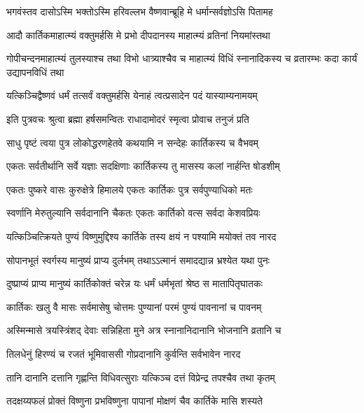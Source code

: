 \twolineshloka
{भगवंस्तव दासोऽस्मि भक्तोऽस्मि हरिवल्लभ}
{वैष्णवान्ब्रूहि मे धर्मान्सर्वज्ञोऽसि पितामह} %

\twolineshloka
{आदौ कार्तिकमाहात्म्यं वक्तुमर्हसि मे प्रभो}
{दीपदानस्य माहात्म्यं व्रतिनां नियमांस्तथा} %

\threelineshloka
{गोपीचन्दनमाहात्म्यं तुलस्याश्च तथा विभो}
{धात्र्याश्चैव च माहात्म्यं विधिं स्नानादिकस्य च}
{व्रतारम्भः कदा कार्यं उद्यापनविधिं तथा} %

\twolineshloka
{यत्किञ्चिद्वैष्णवं धर्मं तत्सर्वं वक्तुमर्हसि}
{येनाहं त्वत्प्रसादेन पदं यास्याम्यनामयम्} %


\twolineshloka
{इति पुत्रवचः श्रुत्वा ब्रह्मा हर्षसमन्वितः}
{राधादामोदरं स्मृत्वा प्रोवाच तनुजं प्रति} %


\twolineshloka
{साधु पृष्टं त्वया पुत्र लोकोद्धरणहेतवे}
{कथयामि न सन्देहः कार्तिकस्य च वैभवम्} %

\twolineshloka
{एकतः सर्वतीर्थानि सर्वे यज्ञाः सदक्षिणाः}
{कार्तिकस्य तु मासस्य कलां नार्हन्ति षोडशीम्} %

\twolineshloka
{एकतः पुष्करे वासः कुरुक्षेत्रे हिमालये}
{एकतः कार्तिकः पुत्र सर्वपुण्याधिको मतः} %

\twolineshloka
{स्वर्णानि मेरुतुल्यानि सर्वदानानि चैकतः}
{एकतः कार्तिको वत्स सर्वदा केशवप्रियः} %

\twolineshloka
{यत्किञ्चित्क्रियते पुण्यं विष्णुमुद्दिश्य कार्तिके}
{तस्य क्षयं न पश्यामि मयोक्तं तव नारद} %

\twolineshloka
{सोपानभूतं स्वर्गस्य मानुष्यं प्राप्य दुर्लभम्}
{तथाऽऽत्मानं समादद्यान्न भ्रश्येत यथा पुनः} %

\twolineshloka
{दुष्प्राप्यं प्राप्य मानुष्यं कार्तिकोक्तं चरेन्न यः}
{धर्मं धर्मभृतां श्रेष्ठ स मातापितृघातकः} %

\twolineshloka
{कार्तिकः खलु वै मासः सर्वमासेषु चोत्तमः}
{पुण्यानां परमं पुण्यं पावनानां च पावनम्} %

\twolineshloka
{अस्मिन्मासे त्रयस्त्रिंशद् देवाः सन्निहिता मुने}
{अत्र स्नानानिदानानि भोजनानि व्रतानि च} %

\twolineshloka
{तिलधेनुं हिरण्यं च रजतं भूमिवाससी}
{गोप्रदानानि कुर्वन्ति सर्वभावेन नारद} %

\twolineshloka
{तानि दानानि दत्तानि गृह्णन्ति विधिवत्सुराः}
{यत्किञ्च दत्तं विप्रेन्द्र तपश्चैव तथा कृतम्} %

\twolineshloka
{तदक्षय्यफलं प्रोक्तं विष्णुना प्रभविष्णुना}
{पापानां मोक्षणं चैव कार्तिके मासि शस्यते} %

